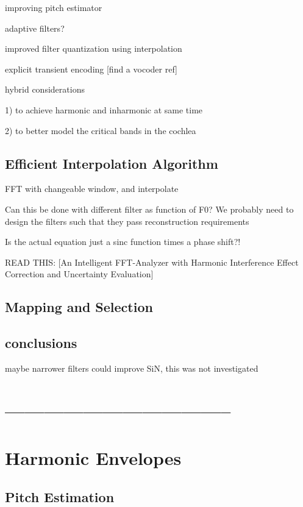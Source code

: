 \documentclass [11pt, proquest] {uwthesis}[2015/03/03]
\begin{document}
improving pitch estimator

adaptive filters?

improved filter quantization using interpolation

explicit transient encoding [find a vocoder ref]

hybrid considerations

1) to achieve harmonic and inharmonic at same time

2) to better model the critical bands in the cochlea


\section{Efficient Interpolation Algorithm}

FFT with changeable window, and interpolate

Can this be done with different filter as function of F0?
We probably need to design the filters such that they pass reconstruction requirements

Is the actual equation just a sinc function times a phase shift?!

READ THIS: [An Intelligent FFT-Analyzer with Harmonic Interference Effect Correction and Uncertainty Evaluation]

\section{Mapping and Selection}

\section{conclusions}

maybe narrower filters could improve SiN, this was not investigated

\chapter{-----------------------------------}


\chapter{Harmonic Envelopes}

\section{Pitch Estimation}
\end{document}
